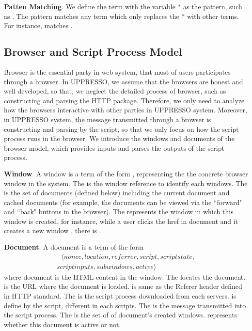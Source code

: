 \vspace{1mm}\noindent\textbf{Patten Matching}.  We define the term with the variable $*$ as the pattern, such as .
The pattern matches any term which only replaces the $*$ with other terms. For instance,   matches .


\subsection{Browser and Script Process Model}
Browser is the essential party in web system, that most of users participates through a browser.
In UPPRESSO, we assume that the browsers are honest and well developed, so that, we neglect  the detailed process of browser, such as constructing and parsing the HTTP package.
Therefore, we only need to analyze how the browsers interactive with other parties in UPPRESSO system.
Moreover, in UPPRESSO system, the message transmitted through a browser is constructing and parsing by the script, so that we only focus on how the script process runs in the browser.
We introduce the windows and documents of the browser model, which provides inputs and parses the outputs of the script process.

\vspace{1mm}
\noindent\textbf{Window}. A window  is a term of the form , representing the  the concrete browser window in the system. The  is the window reference to identify each windows. The  is the set of documents (defined below) including the current document and cached documents (for example, the documents can be viewed via the ``forward" and ``back" buttons in the browser). The  represents the window in which this window is created, for instance, while a user clicks the href in document  and it creates a new window , there is .

\vspace{1mm}
\noindent\textbf{Document}. A document  is a term of the form
\begin{multline*}
  \ \ \ \langle nonce, location, referrer, script, scriptstate, \\
  scriptinputs, subwindows, active \rangle \ \ \
\end{multline*}
where document is the HTML content in the window.  The  locates the document.  is the URL where the document is loaded.  is same as the Referer header defined in HTTP standard. The  is the script process downloaded from each servers.  is define by the script, different in each scripts. The  is the message transmitted into the script process. The  is the set of  of document's created windows.  represents whether this document is active or not.

